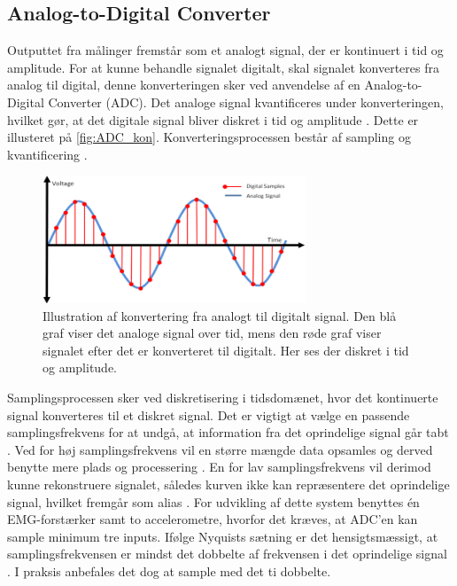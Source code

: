 \subsection{Analog-to-Digital Converter} \label{sec:ADC_teori}
Outputtet fra målinger fremstår som et analogt signal, der er kontinuert i tid og amplitude. For at kunne behandle signalet digitalt, skal signalet konverteres fra analog til digital, denne konverteringen sker ved anvendelse af en Analog-to-Digital Converter (ADC). Det analoge signal kvantificeres under konverteringen, hvilket gør, at det digitale signal bliver diskret i tid og amplitude \citep{webster1998}. Dette er illusteret på \autoref{fig:ADC_kon}. Konverteringsprocessen består af sampling og kvantificering \citep{morre2003}. 

\begin{figure}[H]
\centering
\includegraphics[width=0.7\textwidth]{figures/problemloesning/adc}
\caption{Illustration af konvertering fra analogt til digitalt signal. Den blå graf viser det analoge signal over tid, mens den røde graf viser signalet efter det er konverteret til digitalt. Her ses der diskret i tid og amplitude.}
\label{fig:ADC_kon}
\end{figure}

\noindent
Samplingsprocessen sker ved diskretisering i tidsdomænet, hvor det kontinuerte signal konverteres til et diskret signal. Det er vigtigt at vælge en passende samplingsfrekvens for at undgå, at information fra det oprindelige signal går tabt \citep{morre2003}. Ved for høj samplingsfrekvens vil en større mængde data opsamles og derved benytte mere plads og processering \citep{wolf2004}. En for lav samplingsfrekvens vil derimod kunne rekonstruere signalet, således kurven ikke kan repræsentere det oprindelige signal, hvilket fremgår som alias \citep{morre2003}. 
For udvikling af dette system benyttes én EMG-forstærker samt to accelerometre, hvorfor det kræves, at ADC'en kan sample minimum tre inputs.
Ifølge Nyquists sætning er det hensigtsmæssigt, at samplingsfrekvensen er mindst det dobbelte af frekvensen i det oprindelige signal \citep{morre2003}. I praksis anbefales det dog at sample med det ti dobbelte.

